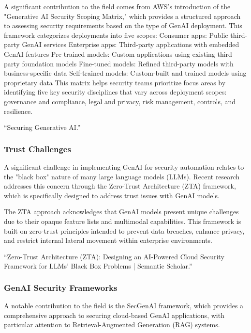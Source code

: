 A significant contribution to the field comes from AWS's introduction of the "Generative AI Security Scoping Matrix," which provides a structured approach to assessing security requirements based on the type of GenAI deployment. This framework categorizes deployments into five scopes:
Consumer apps: Public third-party GenAI services
Enterprise apps: Third-party applications with embedded GenAI features
Pre-trained models: Custom applications using existing third-party foundation models
Fine-tuned models: Refined third-party models with business-specific data
Self-trained models: Custom-built and trained models using proprietary data
This matrix helps security teams prioritize focus areas by identifying five key security disciplines that vary across deployment scopes: governance and compliance, legal and privacy, risk management, controls, and resilience.

“Securing Generative AI.”


\subsubsection{Trust Challenges} %
\label{sec:Trust Challenges}

A significant challenge in implementing GenAI for security automation relates to the "black box" nature of many large language models (LLMs). Recent research addresses this concern through the Zero-Trust Architecture (ZTA) framework, which is specifically designed to address trust issues with GenAI models.

The ZTA approach acknowledges that GenAI models present unique challenges due to their opaque feature lists and multimodal capabilities. This framework is built on zero-trust principles intended to prevent data breaches, enhance privacy, and restrict internal lateral movement within enterprise environments.

“Zero-Trust Architecture (ZTA): Designing an AI-Powered Cloud Security Framework for LLMs’ Black Box Problems | Semantic Scholar.”


\subsubsection{GenAI Security Frameworks} %
\label{sec:GenAI Security Frameworks}

A notable contribution to the field is the SecGenAI framework, which provides a comprehensive approach to securing cloud-based GenAI applications, with particular attention to Retrieval-Augmented Generation (RAG) systems.

